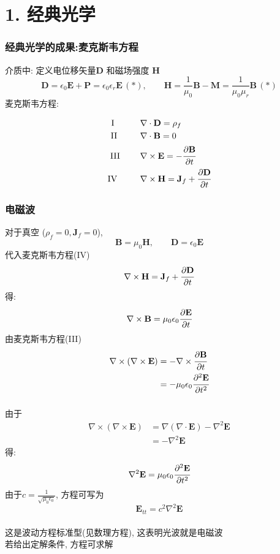 \section{1. 经典光学}

\begin{frame}
      \frametitle{经典光学的成果:麦克斯韦方程}
    介质中: 定义电位移矢量$\mathbf{D}$ 和磁场强度 $\mathbf{H}$
\[ \mathbf{D}=\epsilon_0 \mathbf{E} + \mathbf{P} = \epsilon_0 \epsilon_r \mathbf{E} \, (*),  \qquad \mathbf{H}=\frac{1}{\mu_0} \mathbf{B} -\mathbf{M}= \frac{1}{\mu_0\mu_r}\mathbf{B} \, (*)\]
麦克斯韦方程:

\[ \begin{aligned}
        \text{I}~~~ \hspace*{2em}&\nabla \cdot \mathbf{D} =\rho _f  \\  
        \text{II}~~ \hspace*{2em}&\nabla \cdot \mathbf{B} = 0  \\  
        \text{III}~ \hspace*{2em}&\nabla \times  \mathbf{E} = -\cfrac{\partial \mathbf{B}}{\partial t }  \\  
        \text{IV~}~ \hspace*{2em}&\nabla \times  \mathbf{H} = \mathbf{J}_f +  \cfrac{\partial \mathbf{D}}{\partial t } 
    \end{aligned} \]
\end{frame}

\begin{frame}
      \frametitle{电磁波}
    对于真空 ($\rho _f =0, \mathbf{J}_f =0 $),  \[ \mathbf{B} = \mu_0 \mathbf{H}, \qquad  \mathbf{D} = \epsilon_0 \mathbf{E} \]
代入麦克斯韦方程(IV)
 \[ \nabla \times  \mathbf{H} = \mathbf{J}_f +  \cfrac{\partial \mathbf{D}}{\partial t } \]
得: \[ \nabla \times \mathbf{B} = \mu_0\epsilon_0 \cfrac{\partial \mathbf{E}} {\partial t } \]
由麦克斯韦方程(III)
\[    
\begin{aligned}
  \nabla \times (\nabla \times  \mathbf{E}) &= - \nabla \times \cfrac{\partial \mathbf{B}}{\partial t } \\
  &= - \mu_0\epsilon_0  \cfrac{\partial ^2 \mathbf{E}} {\partial t^2 }
\end{aligned} \]  
\end{frame}

\begin{frame}
      \frametitle{}
    由于
  \[
  \begin{aligned}
      \nabla \times (\nabla \times  \mathbf{E}) &=  \nabla (\nabla \cdot  \mathbf{E})- \nabla^2 \mathbf{E} \\
      &= - \nabla^2 \mathbf{E} 
  \end{aligned} \]
  得:
  \[
  \nabla^2 \mathbf{E}= \mu_0\epsilon_0 \cfrac{\partial ^2 \mathbf{E}} {\partial t^2 }\]
  由于$ c= \frac{1}{\sqrt{\mu_0\epsilon_0}} $, 方程可写为
  \[\boxed{\mathbf{E}_{tt} =c^2\nabla^2 \mathbf{E}}\]
  ~~\\
  这是波动方程标准型(见数理方程), 这表明光波就是电磁波 \\ 若给出定解条件, 方程可求解 \\  
\end{frame}

